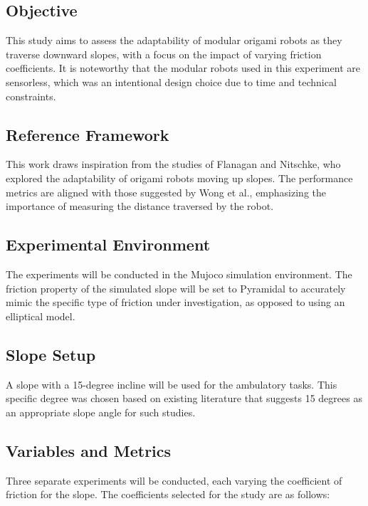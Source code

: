 \documentclass{sigchi}
\begin{document}
\subsection{Objective}
This study aims to assess the adaptability of modular origami robots as they traverse downward slopes, with a focus on the impact of varying friction coefficients. It is noteworthy that the modular robots used in this experiment are sensorless, which was an intentional design choice due to time and technical constraints.

\subsection{Reference Framework}

This work draws inspiration from the studies of Flanagan and Nitschke, who explored the adaptability of origami robots moving up slopes\cite{flanagan_evolving_2023}. The performance metrics are aligned with those suggested by Wong et al.\cite{wong2002performance}, emphasizing the importance of measuring the distance traversed by the robot.

\subsection{ Experimental Environment}

The experiments will be conducted in the Mujoco simulation environment. The friction property of the simulated slope will be set to Pyramidal to accurately mimic the specific type of friction under investigation, as opposed to using an elliptical model.

\subsection{Slope Setup}

A slope with a 15-degree incline will be used for the ambulatory tasks. This specific degree was chosen based on existing literature that suggests 15 degrees as an appropriate slope angle for such studies.

\subsection{ Variables and Metrics}

Three separate experiments will be conducted, each varying the coefficient of friction for the slope. The coefficients selected for the study are as follows:
\end{document}
